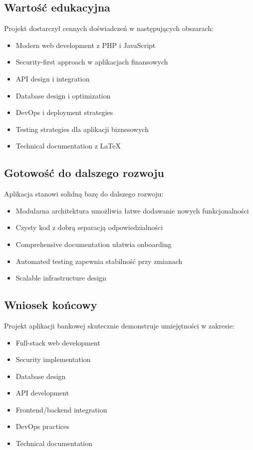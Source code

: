 \documentclass[12pt,a4paper]{article}
\begin{document}
    \subsection{Wartość edukacyjna}

    Projekt dostarczył cennych doświadczeń w następujących obszarach:
    \begin{itemize}
        \item Modern web development z PHP i JavaScript
        \item Security-first approach w aplikacjach finansowych
        \item API design i integration
        \item Database design i optimization
        \item DevOps i deployment strategies
        \item Testing strategies dla aplikacji biznesowych
        \item Technical documentation z LaTeX
    \end{itemize}

    \subsection{Gotowość do dalszego rozwoju}

    Aplikacja stanowi solidną bazę do dalszego rozwoju:
    \begin{itemize}
        \item Modularna architektura umożliwia łatwe dodawanie nowych funkcjonalności
        \item Czysty kod z dobrą separacją odpowiedzialności
        \item Comprehensive documentation ułatwia onboarding
        \item Automated testing zapewnia stabilność przy zmianach
        \item Scalable infrastructure design
    \end{itemize}

    \subsection{Wniosek końcowy}

    Projekt aplikacji bankowej skutecznie demonstruje umiejętności w zakresie:
    \begin{itemize}
        \item Full-stack web development
        \item Security implementation
        \item Database design
        \item API development
        \item Frontend/backend integration
        \item DevOps practices
        \item Technical documentation
    \end{itemize}
\end{document}
